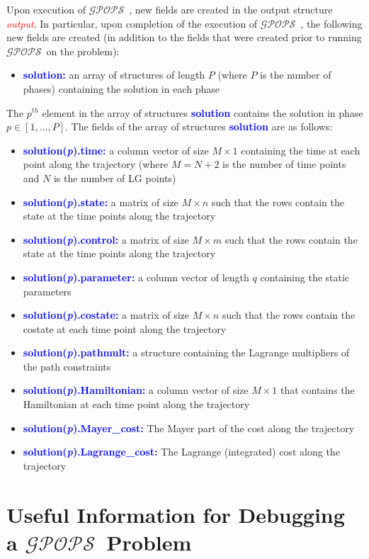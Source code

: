 \documentclass[10pt,final]{report}
\newcommand{\gpops}{$\mathcal{GPOPS}$~}
\newcommand{\bfblue}[1]{\textcolor{blue}{\bf #1}}
\newcommand{\slred}[1]{\textcolor{red}{\sl #1}}
\begin{document}
Upon execution of \gpops, new fields are created in the output structure
\slred{output}.  In particular, upon completion of the execution of
\gpops, the following new fields are created (in addition to the fields
that were created prior to running \gpops on the problem):
\begin{itemize}
  \item \bfblue{solution:}  an array of structures of length $P$
    (where $P$ is the number of phases) containing the solution in each phase
\end{itemize}
The $p^{th}$ element in the array of structures \bfblue{solution}
contains the solution in phase $p\in[1,\ldots,P]$.  The fields of the
array of structures \bfblue{solution} are as follows:
\begin{itemize}
  \item \bfblue{solution(\textit{p}).time:} a column vector of size $M\times 1$
    containing the time at each point along the trajectory (where
    $M=N+2$ is the number of time points and $N$ is the number of LG points)
  \item  \bfblue{solution(\textit{p}).state:}  a matrix of size $M\times n$ such
    that the rows contain the state at the time points along the trajectory
  \item \bfblue{solution(\textit{p}).control:}  a matrix of size $M\times m$ such that the
    rows contain the state at the time points along the trajectory
  \item \bfblue{solution(\textit{p}).parameter:}  a column vector of length $q$
    containing the static parameters
  \item  \bfblue{solution(\textit{p}).costate:}  a matrix of size $M\times n$ such
    that the rows contain the costate at each time point along the trajectory
  \item \bfblue{solution(\textit{p}).pathmult:}  a structure containing the Lagrange
    multipliers of the path constraints
  \item  \bfblue{solution(\textit{p}).Hamiltonian:}  a column vector of size $M\times 1$
    that contains the Hamiltonian at each time point along the trajectory
  \item  \bfblue{solution(\textit{p}).Mayer\_cost:}  The Mayer part of the cost along the trajectory
  \item  \bfblue{solution(\textit{p}).Lagrange\_cost:}  The Lagrange (integrated) cost along the trajectory
\end{itemize}

\section{Useful Information for Debugging a \gpops Problem}
\end{document}
